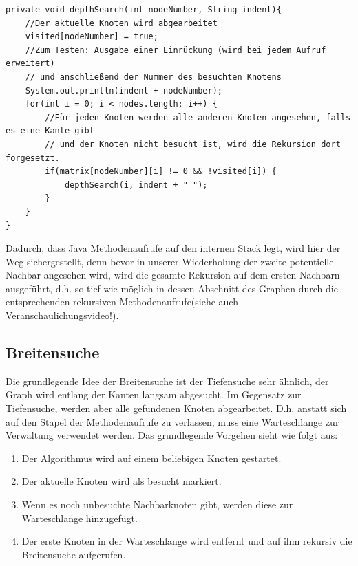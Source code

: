 \documentclass{article}
\begin{document}
\begin{verbatim}
private void depthSearch(int nodeNumber, String indent){
    //Der aktuelle Knoten wird abgearbeitet
    visited[nodeNumber] = true; 
    //Zum Testen: Ausgabe einer Einrückung (wird bei jedem Aufruf erweitert)
    // und anschließend der Nummer des besuchten Knotens
    System.out.println(indent + nodeNumber);
    for(int i = 0; i < nodes.length; i++) {
        //Für jeden Knoten werden alle anderen Knoten angesehen, falls es eine Kante gibt
        // und der Knoten nicht besucht ist, wird die Rekursion dort forgesetzt.
        if(matrix[nodeNumber][i] != 0 && !visited[i]) {
            depthSearch(i, indent + " ");
        }
    }
}
\end{verbatim}
Dadurch, dass Java Methodenaufrufe auf den internen Stack legt, wird hier der Weg  sichergestellt, denn bevor in unserer Wiederholung der zweite potentielle Nachbar angesehen wird, wird die gesamte Rekursion auf dem ersten Nachbarn ausgeführt, d.h. so tief wie möglich in dessen Abschnitt des Graphen durch die entsprechenden rekursiven Methodenaufrufe(siehe auch Veranschaulichungsvideo!). 
\newpage
\subsection{Breitensuche}

Die grundlegende Idee der Breitensuche ist der Tiefensuche sehr ähnlich, der Graph wird entlang der Kanten langsam abgesucht. Im Gegensatz zur Tiefensuche, werden aber alle  gefundenen Knoten abgearbeitet. D.h. anstatt sich auf den Stapel der Methodenaufrufe zu verlassen, muss eine Warteschlange zur Verwaltung verwendet werden. Das grundlegende Vorgehen sieht wie folgt aus:
\begin{enumerate}
    \item Der Algorithmus wird auf einem beliebigen Knoten gestartet.
    \item Der aktuelle Knoten wird als besucht markiert.
    \item Wenn es noch unbesuchte Nachbarknoten gibt, werden diese zur Warteschlange hinzugefügt. 
    \item Der erste Knoten in der Warteschlange wird entfernt und auf ihm rekursiv die Breitensuche aufgerufen.
\end{enumerate}
\end{document}
